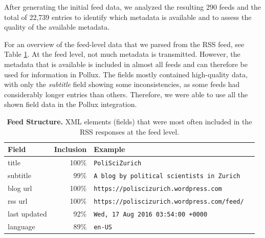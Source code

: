 \documentclass{article}
\begin{document}
After generating the initial feed data, we analyzed the resulting 290 feeds and the total of 22,739 entries to identify which metadata is available and to assess the quality of the available metadata.

For an overview of the feed-level data that we parsed from the RSS feed, see Table \ref{tab:feed_structure}.
At the feed level, not much metadata is transmitted. However, the metadata that is available is included in almost all feeds and can therefore be used for information in Pollux. The fields mostly contained high-quality data, with only the \textit{subtitle} field showing some inconsistencies, as some feeds had considerably longer entries than others. Therefore, we were able to use all the shown field data in the Pollux integration.
\begin{table}[htb]
    \caption{\textbf{Feed Structure.} XML elements (fields) that were most often included in the RSS responses at the feed level.}
    \centering
    \begin{tabular}{lrl}
        \toprule
        \cmidrule(r){1-2}
        \textbf{Field} & \textbf{Inclusion} & \textbf{Example}                                   \\
        \midrule
        title          & 100\%              & \verb|PoliSciZurich                              | \\
        subtitle       & 99\%               & \verb|A blog by political scientists in Zurich   | \\
        blog url       & 100\%              & \verb|https://poliscizurich.wordpress.com        | \\
        rss url        & 100\%              & \verb|https://poliscizurich.wordpress.com/feed/  | \\
        last updated   & 92\%               & \verb|Wed, 17 Aug 2016 03:54:00 +0000            | \\
        language       & 89\%               & \verb|en-US|                                       \\
        \bottomrule
    \end{tabular}
    \label{tab:feed_structure}
\end{table}
\end{document}
